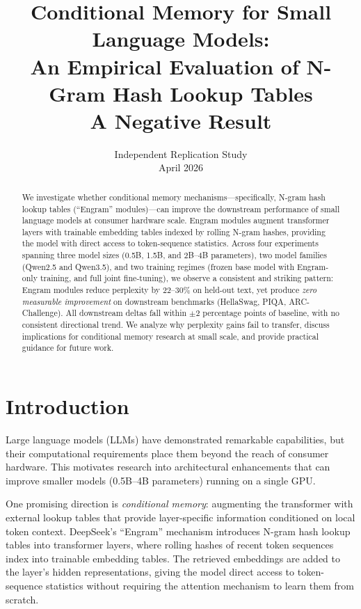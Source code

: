 \documentclass{article}
\title{\Large\textbf{Conditional Memory for Small Language Models: \\ An Empirical Evaluation of N-Gram Hash Lookup Tables} \\ \vspace{0.3em} \normalsize A Negative Result}
\author{Independent Replication Study \\ April 2026}
\date{}
\begin{document}
\maketitle

\begin{abstract}
We investigate whether conditional memory mechanisms---specifically, N-gram hash lookup tables (``Engram'' modules)---can improve the downstream performance of small language models at consumer hardware scale. Engram modules augment transformer layers with trainable embedding tables indexed by rolling N-gram hashes, providing the model with direct access to token-sequence statistics. Across four experiments spanning three model sizes (0.5B, 1.5B, and 2B--4B parameters), two model families (Qwen2.5 and Qwen3.5), and two training regimes (frozen base model with Engram-only training, and full joint fine-tuning), we observe a consistent and striking pattern: Engram modules reduce perplexity by 22--30\% on held-out text, yet produce \emph{zero measurable improvement} on downstream benchmarks (HellaSwag, PIQA, ARC-Challenge). All downstream deltas fall within $\pm$2 percentage points of baseline, with no consistent directional trend. We analyze why perplexity gains fail to transfer, discuss implications for conditional memory research at small scale, and provide practical guidance for future work.
\end{abstract}

\section{Introduction}

Large language models (LLMs) have demonstrated remarkable capabilities, but their computational requirements place them beyond the reach of consumer hardware. This motivates research into architectural enhancements that can improve smaller models (0.5B--4B parameters) running on a single GPU.

One promising direction is \emph{conditional memory}: augmenting the transformer with external lookup tables that provide layer-specific information conditioned on local token context. DeepSeek's ``Engram'' mechanism \cite{deepseekv3} introduces N-gram hash lookup tables into transformer layers, where rolling hashes of recent token sequences index into trainable embedding tables. The retrieved embeddings are added to the layer's hidden representations, giving the model direct access to token-sequence statistics without requiring the attention mechanism to learn them from scratch.
\end{document}
